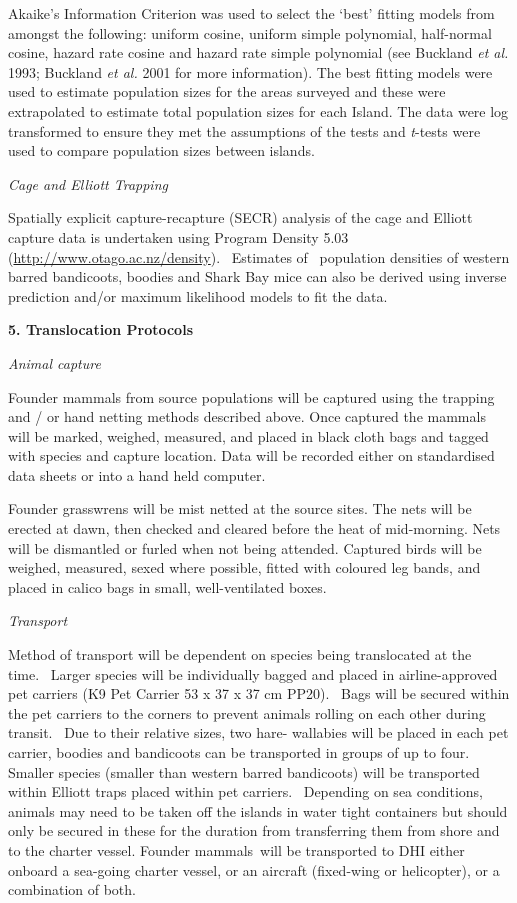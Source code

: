 \documentclass[version=last,
    paper=a4,                               %
    10pt,                                   %
    dvipsnames,
    oneside,                              %
    headings=openany,                       %
    open=any,
    BCOR=7mm,                               %
    DIV=15,     %
]{scrbook}
\begin{document}
Akaike's Information Criterion was used to select the `best' fitting
models from amongst the following: uniform cosine, uniform simple
polynomial, half-normal cosine, hazard rate cosine and hazard rate
simple polynomial (see Buckland \emph{et al.} 1993; Buckland \emph{et
al.} 2001 for more information). The best fitting models were used to
estimate population sizes for the areas surveyed and these were
extrapolated to estimate total population sizes for each Island. The
data were log transformed to ensure they met the assumptions of the
tests and \emph{t}-tests were used to compare population sizes between
islands.

\emph{Cage and Elliott Trapping}

Spatially explicit capture-recapture (SECR) analysis of the cage and
Elliott capture data is undertaken using Program Density 5.03
(\url{http://www.otago.ac.nz/density}).~ Estimates of ~population
densities of western barred bandicoots, boodies and Shark Bay mice can
also be derived using inverse prediction and/or maximum likelihood
models to fit the data.

\textbf{5. Translocation Protocols}

\emph{Animal capture}

Founder mammals from source populations will be captured using the
trapping and / or hand netting methods described above. Once captured
the mammals will be marked, weighed, measured, and placed in black cloth
bags and tagged with species and capture location. Data will be recorded
either on standardised data sheets or into a hand held computer.

Founder grasswrens will be mist netted at the source sites. The nets
will be erected at dawn, then checked and cleared before the heat of
mid-morning. Nets will be dismantled or furled when not being attended.
Captured birds will be weighed, measured, sexed where possible, fitted
with coloured leg bands, and placed in calico bags in small,
well-ventilated boxes.

\emph{Transport}

Method of transport will be dependent on species being translocated at
the time.~ Larger species will be individually bagged and placed in
airline-approved pet carriers (K9 Pet Carrier 53 x 37 x 37 cm PP20).
~Bags will be secured within the pet carriers to the corners to prevent
animals rolling on each other during transit.~ Due to their relative
sizes, two hare- wallabies will be placed in each pet carrier, boodies
and bandicoots can be transported in groups of up to four.~ Smaller
species (smaller than western barred bandicoots) will be transported
within Elliott traps placed within pet carriers.~ Depending on sea
conditions, animals may need to be taken off the islands in water tight
containers but should only be secured in these for the duration from
transferring them from shore and to the charter vessel. Founder
mammals~will be transported to DHI either onboard a sea-going charter
vessel, or an aircraft (fixed-wing or helicopter), or a combination of
both.
\end{document}

